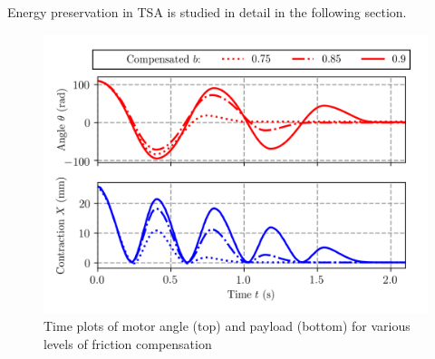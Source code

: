 Energy preservation in TSA is studied in detail in the following section.
\begin{figure}
		\centering
		\includegraphics[trim= 0.0cm 1.0cm 0.0cm 0.0cm,width=1.0\columnwidth]{pics/plots/exp_var_damp.png}
		\caption{Time plots of motor angle (top) and payload (bottom) for various levels of friction compensation}
 		\label{fig:friction_cancellation}
		\vspace*{-2mm} 
\end{figure}

